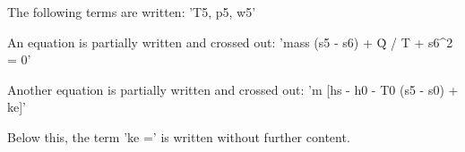 The following terms are written:  
'T5, p5, w5'  

An equation is partially written and crossed out:  
'mass (s5 - s6) + Q̇ / T + s6^2 = 0'  

Another equation is partially written and crossed out:  
'm [hs - h0 - T0 (s5 - s0) + ke]'  

Below this, the term 'ke =' is written without further content.